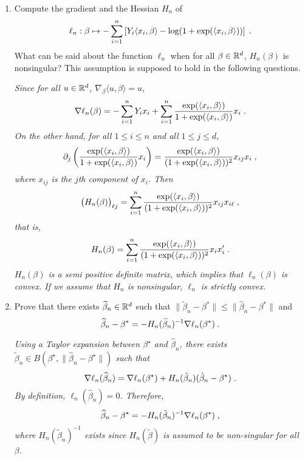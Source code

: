 \begin{enumerate}
\item Compute the gradient and the Hessian $H_{n}$ of
\[
\ell_{n}:\beta \mapsto -\sum_{i=1}^n\left[Y_{i}\langle x_{i},\beta\rangle-\log(1+\exp(\langle x_{i},\beta\rangle))\right]\;.
\]
What can be said about the function $\ell_{n}$ when for all $\beta\in\mathbb{R}^d$, $H_{n}(\beta)$ is nonsingular? This assumption is supposed to hold in the following questions.

\vspace{.2cm}

{\em
Since for all $u\in\mathbb{R}^d$, $\nabla_{\beta} \langle u, \beta \rangle = u$, 
\[
\nabla \ell_n(\beta) = - \sum_{i=1}^n Y_i x_i + \sum_{i=1}^n \frac{\exp(\langle x_{i},\beta\rangle)}{1  + \exp(\langle x_{i},\beta\rangle)} x_i\;.
\]
On the other hand, for all $1\leqslant i \leqslant n$ and all $1 \leqslant j \leqslant d$,
\[
\partial_j \left( \frac{\exp(\langle x_{i},\beta\rangle)}{1  + \exp(\langle x_{i},\beta\rangle)} x_i \right) = \frac{\exp(\langle x_{i},\beta\rangle)}{(1  + \exp(\langle x_{i},\beta\rangle))^2} x_{ij}x_i\;,
\]
where $x_{ij}$ is the $j$th component of $x_i$. Then
\[
\big(H_n(\beta)\big)_{\ell j} = \sum_{i=1}^n \frac{\exp(\langle x_{i},\beta\rangle)}{(1  + \exp(\langle x_{i},\beta\rangle))^2} x_{ij}x_{i \ell}\;,
\]
that is,
\[
H_n(\beta) = \sum_{i=1}^n \frac{\exp(\langle x_{i},\beta\rangle)}{(1  + \exp(\langle x_{i},\beta\rangle))^2} x_{i} x_{i}'\;.
\]
$H_n(\beta)$ is a semi positive definite matrix, which implies that $\ell_n(\beta)$ is convex. If we assume that $H_n$ is nonsingular, $\ell_n$  is strictly convex.
}
\item Prove that there exists $\widetilde \beta_n\in\mathbb{R}^d$ such that $\|\widetilde \beta_n-\beta^*\|\leq \|\widehat \beta_n-\beta^*\|$ and
\[
\widehat \beta_n-\beta^*=-H_{n}(\widetilde \beta_n)^{-1}\nabla \ell_{n}(\beta^*)\;.
\]

\vspace{.2cm}

{\em
Using a Taylor expansion between $\beta^{\star}$ and $\widehat{\beta}_n$, there exists $\tilde{\beta}_n \in B(\beta^{\star}, \|\widehat{\beta}_n - \beta^{\star}\|)$ such that 
\[
\nabla \ell_n(\widehat{\beta}_n) = \nabla \ell_n(\beta^{\star}) + H_n(\tilde{\beta}_n) ( \hat{\beta}_n - \beta^{\star})\;. 
\]
By definition, $\ell_n(\widehat{\beta}_n) = 0$. Therefore, 
\[
\widehat{\beta}_n - \beta^{\star} = - H_n(\tilde{\beta}_n)^{-1} \nabla \ell_n(\beta^{\star})\;,
\]
where $H_n(\tilde{\beta}_n)^{-1}$ exists since $H_n(\tilde{\beta})$ is assumed to be non-singular for all $\beta$.
}
\end{enumerate}

